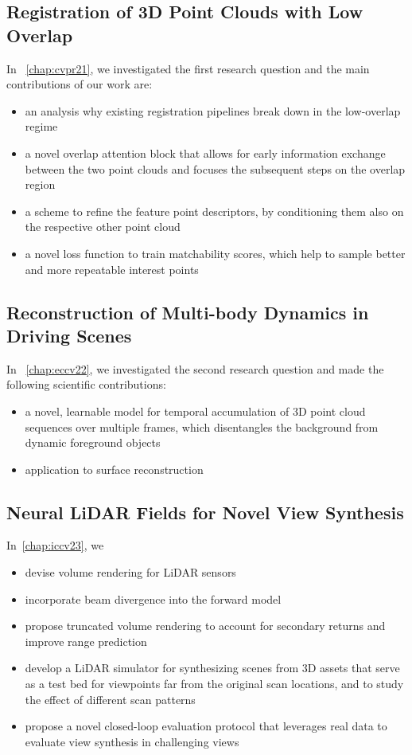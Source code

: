 \subsection{Registration of 3D Point Clouds with Low Overlap}
In ~\cref{chap:cvpr21}, we investigated the first research question and the main contributions of our work are:

\begin{itemize}
    \item an analysis why existing registration pipelines break down in the low-overlap regime
    \item a novel overlap attention block that allows for early information exchange between the two point clouds and focuses the subsequent steps on the overlap region
    \item a scheme to reﬁne the feature point descriptors, by conditioning them also on the respective other point cloud
    \item a novel loss function to train matchability scores, which help to sample better and more repeatable interest points
\end{itemize}

\subsection{Reconstruction of Multi-body Dynamics in Driving Scenes}

In ~\cref{chap:eccv22}, we investigated the second research question and made the following scientific contributions:
\begin{itemize}
    \item a novel, learnable model for temporal accumulation of 3D point cloud sequences over multiple frames, which disentangles the background from dynamic foreground objects
    \item application to surface reconstruction
\end{itemize}

\subsection{Neural LiDAR Fields for Novel View Synthesis}

In~\cref{chap:iccv23}, we 

\begin{itemize}
    \item devise volume rendering for LiDAR sensors
    \item incorporate beam divergence into the forward model
    \item propose truncated volume rendering to account for secondary returns and improve range prediction
    \item develop a LiDAR simulator for synthesizing scenes from 3D assets that serve as a test bed for viewpoints far from the original scan locations, and to study the effect of different scan patterns
    \item propose a novel closed-loop evaluation protocol that leverages real data to evaluate view synthesis in challenging views
\end{itemize}


